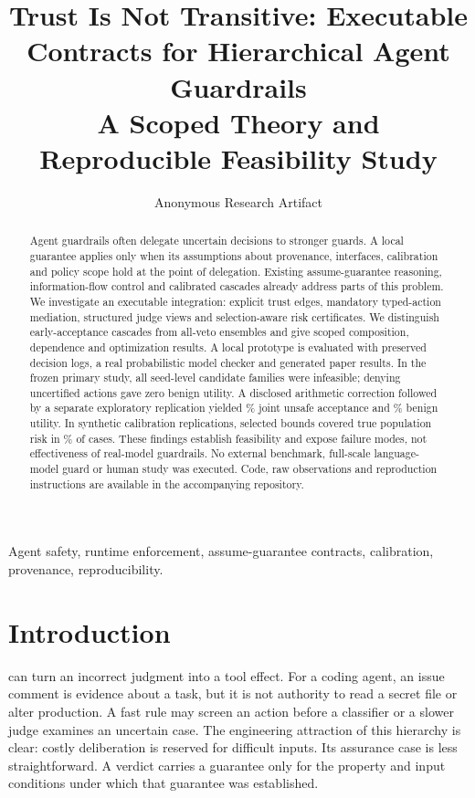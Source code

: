 ﻿\documentclass[lettersize,journal]{IEEEtran}
\begin{document}
\title{Trust Is Not Transitive: Executable Contracts for Hierarchical Agent Guardrails\\A Scoped Theory and Reproducible Feasibility Study}
\author{Anonymous Research Artifact}
\maketitle

\begin{abstract}
Agent guardrails often delegate uncertain decisions to stronger guards. A local
guarantee applies only when its assumptions about provenance, interfaces,
calibration and policy scope hold at the point of delegation. Existing
assume-guarantee reasoning, information-flow control and calibrated cascades
already address parts of this problem. We investigate an executable integration:
explicit trust edges, mandatory typed-action mediation, structured judge views
and selection-aware risk certificates. We distinguish early-acceptance cascades
from all-veto ensembles and give scoped composition, dependence and optimization
results. A local prototype is evaluated with preserved decision logs, a real
probabilistic model checker and generated paper results. In the frozen primary
study, all \resPrimaryInfeasible{} seed-level candidate families were infeasible;
denying uncertified actions gave zero benign utility. A disclosed arithmetic
correction followed by a separate exploratory replication yielded
\resExploratoryCheckedQuarantineRisk{}\% joint unsafe acceptance and
\resExploratoryCheckedQuarantineUtility{}\% benign utility. In
\resPrimaryReplications{} synthetic calibration replications, selected bounds
covered true population risk in \resPrimaryCoverage{}\% of cases. These findings
establish feasibility and expose failure modes, not effectiveness of real-model
guardrails. No external benchmark, full-scale language-model guard or human
study was executed. Code, raw observations and reproduction instructions are
available in the accompanying repository.
\end{abstract}
\begin{IEEEkeywords}
Agent safety, runtime enforcement, assume-guarantee contracts, calibration,
provenance, reproducibility.
\end{IEEEkeywords}

\section{Introduction}
 can turn an incorrect judgment into a tool effect.
For a coding agent, an issue comment is evidence about a task, but it is not
authority to read a secret file or alter production. A fast rule may screen an
action before a classifier or a slower judge examines an uncertain case. The
engineering attraction of this hierarchy is clear: costly deliberation is
reserved for difficult inputs. Its assurance case is less straightforward.
A verdict carries a guarantee only for the property and input conditions under
which that guarantee was established.
\end{document}
